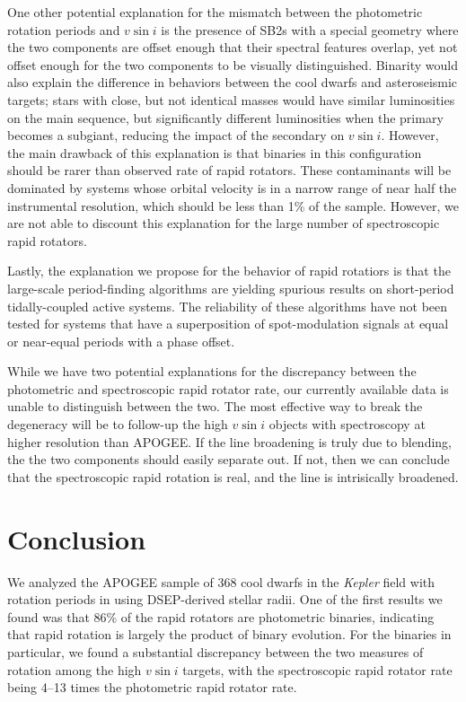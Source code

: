 \documentclass[manuscript]{aastex6}
\newcommand{\vsini}{\ensuremath{v \sin i}}
\newcommand{\Kepler}{\mbox{\textit{Kepler}}}
\begin{document}
One other potential explanation for the mismatch between the photometric
rotation periods and \vsini{} is the presence of SB2s with a special geometry
where the two components are offset enough that their spectral features
overlap, yet not offset enough for the two components to be visually
distinguished. Binarity would also explain the difference in behaviors
between the cool dwarfs and asteroseismic targets; stars with close, but
not identical masses would have similar luminosities on the main
sequence, but significantly different luminosities when the primary
becomes a subgiant, reducing the impact of the secondary on
\vsini{}. However, the main drawback of this explanation is that
binaries in this configuration should be rarer than observed rate of
rapid rotators. These contaminants will be dominated by systems whose
orbital velocity is in a narrow range of near half the instrumental
resolution, which should be less than 1\% of the sample. However, we are
not able to discount this explanation for the large number of
spectroscopic rapid rotators.

Lastly, the explanation we propose for the behavior of rapid rotatiors is that 
the large-scale period-finding algorithms are yielding
spurious results on short-period tidally-coupled active systems. The
reliability of these algorithms have not been tested for systems that
have a superposition of spot-modulation signals at equal or near-equal
periods with a phase offset. 

While we have two potential explanations for the discrepancy between the
photometric and spectroscopic rapid rotator rate, our currently
available data is unable to distinguish between the two. The most
effective way to break the degeneracy will be to follow-up the high
\vsini{} objects with spectroscopy at higher resolution than APOGEE\@. If
the line broadening is truly due to blending, the the two components
should easily separate out. If not, then we can conclude that the
spectroscopic rapid rotation is real, and the line is intrisically
broadened.

\section{Conclusion}
\label{sec:conclusions}

We analyzed the APOGEE sample of 368 cool dwarfs in the \Kepler{} field with 
rotation periods in \citet{McQuillan14} using DSEP-derived stellar radii. One
of the first results we found was that 86\% of the rapid rotators are
photometric binaries, indicating that rapid rotation is largely the product of
binary evolution. For the binaries in particular, we
found a substantial discrepancy between the two measures of rotation
among the high \vsini{} targets, with the spectroscopic rapid
rotator rate being 4--13 times the photometric rapid rotator rate. 
\end{document}
